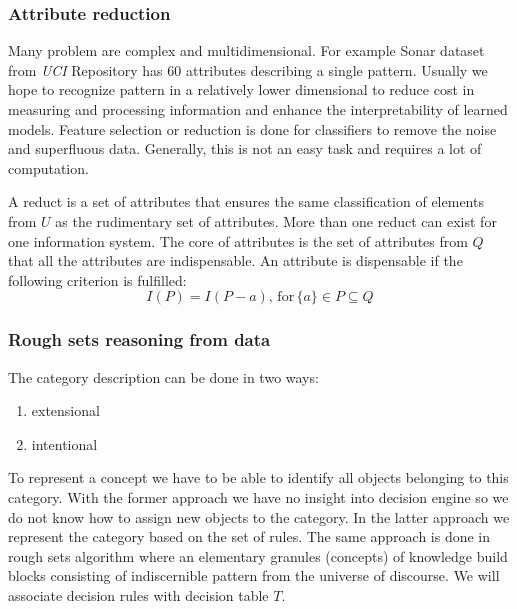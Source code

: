 \subsubsection{Attribute reduction }
\label{cha:Rough_set_attribute_reduction}
Many problem are complex and multidimensional. For example Sonar dataset from
\textit{UCI} Repository has 60 attributes describing a single pattern. 
Usually we hope to recognize pattern in a relatively
lower dimensional to reduce cost in measuring and processing information and
enhance the interpretability of learned models. Feature selection or reduction 
is done for classifiers to remove the noise and superfluous data. Generally,
this is not an easy task and requires a lot of computation. 


A reduct is a set of attributes that ensures the same classification of
elements from $U$ as the rudimentary set of attributes. More than one reduct
can exist for one information system. The core of attributes is the set of
attributes from $Q$ that all the attributes are indispensable. An attribute is
dispensable if the following criterion is fulfilled:
$$I(P) = I(P-{a}), \, \textrm{for} \, \{a\} \in P \subseteq  Q $$

\subsubsection{Rough sets reasoning from data}
The category description can be done in two ways:
\begin{enumerate}
    \item extensional
    \item intentional
\end{enumerate}
To represent a concept we have to be able to identify all objects belonging 
to this category. With the former approach we have no insight 
into decision engine so we do not know how to assign new objects to the category.
In the latter approach we represent the category based on the set of rules. The same 
approach is done in rough sets algorithm where an elementary 
granules (concepts) of knowledge build blocks consisting 
of indiscernible pattern from the universe of discourse. 
We will associate decision rules with decision table $T$.

